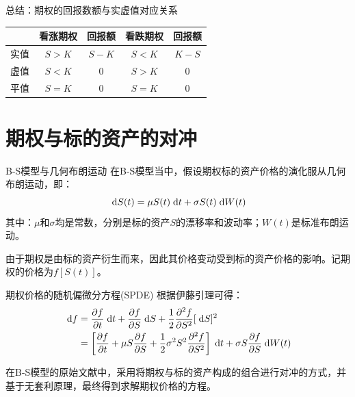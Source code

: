 \documentclass[t]{beamer}
\newcommand{\dif}{{\;\rm d}}
\begin{document}
\begin{frame}{总结：期权的回报数额与实虚值对应关系}
\begin{center}
\begin{tabular}{c|cc|cc}
\hline
& 看涨期权&回报额 &看跌期权&回报额 \\
\hline
实值 & $S>K$&$S-K$  & $S<K$&$K-S$ \\
虚值 & $S<K$&0  & $S>K$&0\\
平值 & $S=K$&0  & $S=K$&0\\
\hline
\end{tabular}
\end{center}
\end{frame}


\section{期权与标的资产的对冲}

\begin{frame}{B-S模型与几何布朗运动}
在B-S模型当中，假设期权标的资产价格的演化服从几何布朗运动，即：
\begin{equation*}
\dif S(t)=\mu S(t)\dif t+\sigma S(t)\dif W(t)
\end{equation*}
其中：$\mu$和$\sigma$均是常数，分别是标的资产$S$的漂移率和波动率；$W(t)$是标准布朗运动。

由于期权是由标的资产衍生而来，因此其价格变动受到标的资产价格的影响。记期权的价格为$f[S(t)]$。
\end{frame}




\begin{frame}{期权价格的随机偏微分方程(SPDE)}
根据伊藤引理可得：
\begin{equation*}
\begin{split}
\dif f&=\frac{\partial f}{\partial t}\dif t+\frac{\partial f}{\partial S}\dif S+\frac{1}{2}\frac{\partial^2 f}{\partial S^2}[\dif S]^2\\
&=\left[\frac{\partial f}{\partial t}+\mu S\frac{\partial f}{\partial S}+\frac{1}{2}\sigma^2S^2\frac{\partial^2 f}{\partial S^2} \right]\dif t+\sigma S\frac{\partial f}{\partial S}\dif W(t)
\end{split}
\end{equation*}

\begin{block}{}
在B-S模型的原始文献中，采用将期权与标的资产构成的组合进行对冲的方式，并基于无套利原理，最终得到求解期权价格的方程。
\end{block}
\end{frame}
\end{document}
